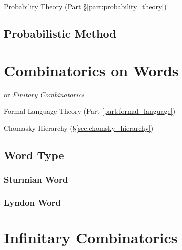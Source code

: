 Probability Theory (Part \S\ref{part:probability_theory})



\subsection{Probabilistic Method}\label{sec:probabilistic_method}



\section{Combinatorics on Words}\label{sec:combinatorics_on_words}

or \emph{Finitary Combinatorics}

Formal Language Theory (Part \ref{part:formal_language})

Chomasky Hierarchy (\S\ref{sec:chomsky_hierarchy})



\subsection{Word Type}\label{sec:word_type}

\subsubsection{Sturmian Word}\label{sec:sturmian_word}

\subsubsection{Lyndon Word}\label{sec:lyndon_word}



\section{Infinitary Combinatorics}\label{sec:infinitary_combinatorics}

